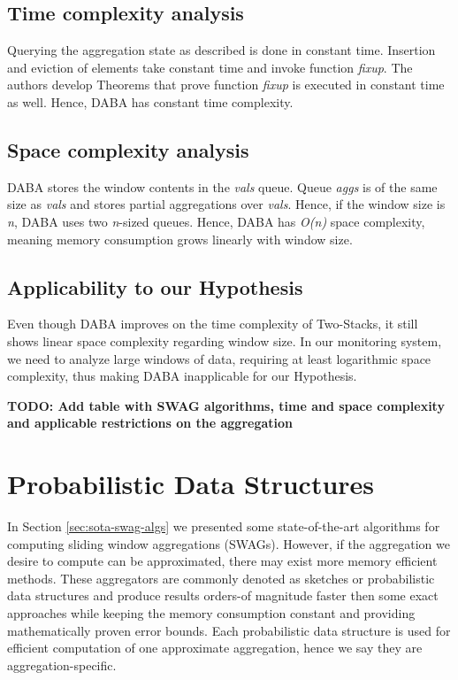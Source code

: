 \subsection*{Time complexity analysis}
Querying the aggregation state as described is done in constant time. Insertion and eviction of elements take constant time and invoke function \textit{fixup}. The authors develop Theorems that prove function \textit{fixup} is executed in constant time as well. Hence, DABA has constant time complexity.

\subsection*{Space complexity analysis}
DABA stores the window contents in the \textit{vals} queue. Queue \textit{aggs} is of the same size as \textit{vals} and stores partial aggregations over \textit{vals}. Hence, if the window size is \textit{n}, DABA uses two \textit{n}-sized queues. Hence, DABA has \textit{O(n)} space complexity, meaning memory consumption grows linearly with window size.

\subsection*{Applicability to our Hypothesis}
Even though DABA improves on the time complexity of Two-Stacks, it still shows linear space complexity regarding window size. In our monitoring system, we need to analyze large windows of data, requiring at least logarithmic space complexity, thus making DABA inapplicable for our Hypothesis.


\textbf{TODO: Add table with SWAG algorithms, time and space complexity and applicable restrictions on the aggregation}

\section{Probabilistic Data Structures} \label{sec:pds}
In Section \ref{sec:sota-swag-algs} we presented some state-of-the-art algorithms for computing sliding window aggregations (SWAGs). However, if the aggregation we desire to compute can be approximated, there may exist more memory efficient methods. These aggregators are commonly denoted as sketches or probabilistic data structures and produce results orders-of magnitude faster then some exact approaches while keeping the memory consumption constant and providing mathematically proven error bounds. Each probabilistic data structure is used for efficient computation of one approximate aggregation, hence we say they are aggregation-specific.

